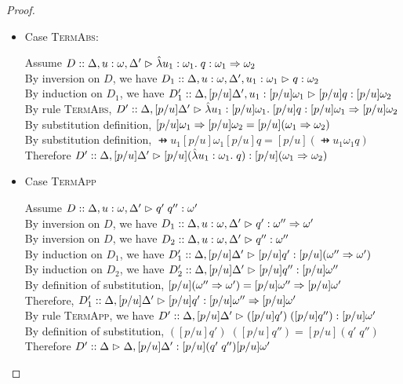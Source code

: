 \begin{proof}
\begin{enumerate}
\begin{itemize}
    \item Case \textsc{TermAbs}:
      \begin{tabbedproof}
        \oo Assume $D :: \judgeA[\Delta, u:\omega, \Delta']{\pfun{u_1}{\omega_1}{q}}{\omega_1 \To \omega_2}$ \\
        \ooo By inversion on $D$, we have $D_1 :: \judgeA[\Delta, u:\omega, \Delta', u_1:\omega_1]{q}{\omega_2}$ \\
        \ooo By induction on $D_1$, we have 
             $D'_1 :: \judgeA[{\Delta, [p/u]\Delta', u_1:[p/u]\omega_1}]{[p/u]q}{[p/u]\omega_2}$ \\
        \ooo By rule \textsc{TermAbs}, 
             $D' :: \judgeA[{\Delta, [p/u]\Delta'}]{\pfun{u_1}{[p/u]\omega_1}{[p/u]q}}{[p/u]\omega_1 \To [p/u]\omega_2}$ \\
        \ooo By substitution definition, $[p/u]\omega_1 \To [p/u]\omega_2 = [p/u](\omega_1 \To \omega_2)$ \\
        \ooo By substitution definition, $\pfun{u_1}{[p/u]\omega_1}{[p/u]q} = [p/u](\pfun{u_1}{\omega_1}{q})$ \\
        \ooo Therefore 
           $D' :: \judgeA[{\Delta, [p/u]\Delta'}]{[p/u](\pfun{u_1}{\omega_1}{q})}{[p/u](\omega_1 \To \omega_2)}$ \\
      \end{tabbedproof}

    \item Case \textsc{TermApp}
      \begin{tabbedproof}
        \oo Assume $D :: \judgeA[\Delta, u:\omega, \Delta']{q'\;q''}{\omega'}$ \\
        \ooo By inversion on $D$, we have $D_1 :: \judgeA[\Delta, u:\omega, \Delta']{q'}{\omega'' \To \omega'}$ \\
        \ooo By inversion on $D$, we have $D_2 :: \judgeA[\Delta, u:\omega, \Delta']{q''}{\omega''}$ \\
        \ooo By induction on $D_1$, we have $D'_1 :: \judgeA[{\Delta, [p/u]\Delta'}]{[p/u]q'}{[p/u](\omega'' \To \omega')}$ \\
        \ooo By induction on $D_2$, we have $D'_2 :: \judgeA[{\Delta, [p/u]\Delta'}]{[p/u]q''}{[p/u]\omega''}$ \\
        \ooo By definition of substitution, $[p/u](\omega'' \To \omega') = [p/u]\omega'' \To [p/u]\omega'$ \\
        \ooo Therefore, $D'_1 :: \judgeA[{\Delta, [p/u]\Delta'}]{[p/u]q'}{[p/u]\omega'' \To [p/u]\omega'}$ \\
        \ooo By rule \textsc{TermApp}, we have 
           $D' :: \judgeA[{\Delta, [p/u]\Delta'}]{([p/u]q')\;([p/u]q'')}{[p/u]\omega'}$ \\
        \ooo By definition of substitution, $([p/u]q')\;([p/u]q'') = [p/u](q'\;q'')$ \\
        \ooo Therefore $D' :: \judgeA{\Delta, [p/u]\Delta'}{[p/u](q'\;q'')}{[p/u]\omega'}$ \\
      \end{tabbedproof}


\end{itemize}
\end{enumerate}
\end{proof}
